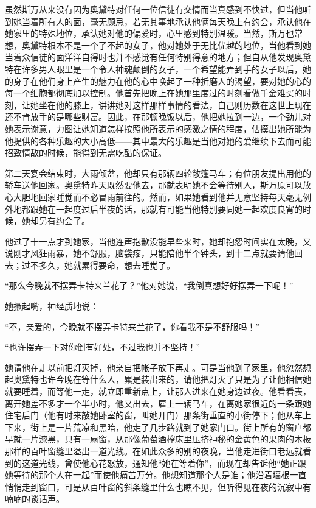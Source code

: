 \par 虽然斯万从来没有因为奥黛特对任何一位信徒有交情而当真感到不快过，但当他听到她当着所有人的面，毫无顾忌，若无其事地承认他俩每天晚上有约会，承认他在她家里的特殊地位，承认她对他的偏爱时，心里感到特别温暖。当然，斯万也常想，奥黛特根本不是一个了不起的女子，他对她处于无比优越的地位，当他看到她当着众信徒的面洋洋自得时也并不感觉有任何特别得意的地方；但自从他发现奥黛特在许多男人眼里是一个令人神魂颠倒的女子，一个希望能弄到手的女子以后，她的身子在他们身上产生的魅力在他的心中唤起了一种折磨人的渴望，要对她的心的每一个细胞都彻底加以控制。他首先把晚上在她那里度过的时刻看做千金难买的时刻，让她坐在他的膝上，讲讲她对这样那样事情的看法，自己则历数在这世上现在还不肯放手的是哪些财富。因此，在那顿晚饭以后，他把她拉到一边，一个劲儿对她表示谢意，力图让她知道怎样按照他所表示的感激之情的程度，估摸出她所能为他提供的各种乐趣的大小高低——其中最大的乐趣是当他对她的爱继续下去而可能招致情敌的时候，能得到无需吃醋的保证。
\par 第二天宴会结束时，大雨倾盆，他却只有那辆四轮敞篷马车；有位朋友提出用他的轿车送他回家。奥黛特昨天既然要他去，那就表明她不会等待别人，斯万原可以放心大胆地回家睡觉而不必冒雨前往的。然而，如果她看到他并无意坚持每天毫无例外地都跟她在一起度过后半夜的话，那就有可能当他特别要同她一起欢度良宵的时候，她却另有约会了。
\par 他过了十一点才到她家，当他连声抱歉没能早些来时，她却抱怨时间实在太晚，又说刚才风狂雨暴，她不舒服，脑袋疼，只能陪他半个钟头，到十二点就要请他回去；过不多久，她就累得要命，想去睡觉了。
\par “那么今晚就不摆弄卡特来兰花了？”他对她说，“我倒真想好好摆弄一下呢！”
\par 她撅起嘴，神经质地说：
\par “不，亲爱的，今晚就不摆弄卡特来兰花了，你看我不是不舒服吗！”
\par “也许摆弄一下对你倒有好处，不过我也并不坚持！”
\par 她请他在走以前把灯灭掉，他亲自把帐子放下再走。可是当他到了家里，他忽然想起奥黛特也许今晚在等什么人，累是装出来的，请他把灯灭了只是为了让他相信她就要睡着，而等他一走，就立即重新点上，让那人进来在她身边过夜。他看看表，离开她差不多才一个半小时，他又出去，雇上一辆马车，在离她家很近的一条跟她住宅后门（他有时来敲她卧室的窗，叫她开门）那条街垂直的小街停下；他从车上下来，街上是一片荒凉和黑暗，他走了几步路就到了她家门口。街上所有的窗户都早就一片漆黑，只有一扇窗，从那像葡萄酒榨床里压挤神秘的金黄色的果肉的木板那样的百叶窗缝里溢出一道光线。在如此众多的别的夜晚，当他走进街口老远就看到的这道光线，曾使他心花怒放，通知他“她在等着你”，而现在却告诉他“她正跟她等待的那个人在一起”而使他痛苦万分。他想知道那个人是谁；他沿着墙根一直悄悄走到窗口，可是从百叶窗的斜条缝里什么也瞧不见，但听得见在夜的沉寂中有喃喃的谈话声。
